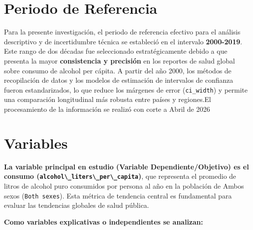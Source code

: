 \documentclass[oneside,11pt]{Latex/Classes/PhDthesisPSnPDF}
\begin{document}
\section{Periodo de Referencia}

Para la presente investigación, el periodo de referencia efectivo para
el análisis descriptivo y de incertidumbre técnica se estableció en el
intervalo \textbf{2000-2019}. Este rango de dos décadas fue seleccionado
estratégicamente debido a que presenta la mayor \textbf{consistencia y
precisión} en los reportes de salud global sobre consumo de alcohol per
cápita. A partir del año 2000, los métodos de recopilación de datos y
los modelos de estimación de intervalos de confianza fueron
estandarizados, lo que reduce los márgenes de error (\texttt{ci\_width})
y permite una comparación longitudinal más robusta entre países y
regiones.El procesamiento de la información se realizó con corte a Abril
de 2026\\

\section{Variables}

\textbf{La variable principal en estudio (Variable Dependiente/Objetivo)
es el consumo
(\texttt{alcohol\textbackslash{}\_liters\textbackslash{}\_per\textbackslash{}\_capita})},
que representa el promedio de litros de alcohol puro consumidos por
persona al año en la población de Ambos sexos (\texttt{Both\ sexes}).
Esta métrica de tendencia central es fundamental para evaluar las
tendencias globales de salud pública.

\textbf{Como variables explicativas o independientes se analizan:}
\end{document}
